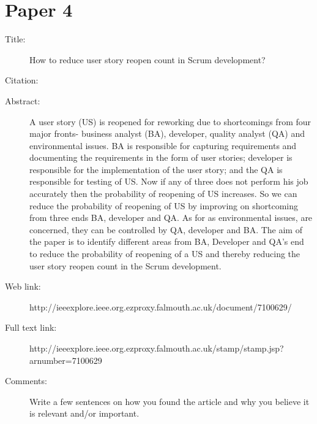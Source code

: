 \documentclass{scrartcl}
\begin{document}
\section*{Paper 4}
\begin{description}
\item[Title:] How to reduce user story reopen count in Scrum development?
\item[Citation:] \cite{chauhan2015reduce}
\item[Abstract:] A user story (US) is reopened for reworking due to shortcomings from four major fronts- business analyst (BA), developer, quality analyst (QA) and environmental issues. BA is responsible for capturing requirements and documenting the requirements in the form of user stories; developer is responsible for the implementation of the user story; and the QA is responsible for testing of US. Now if any of three does not perform his job accurately then the probability of reopening of US increases. So we can reduce the probability of reopening of US by improving on shortcoming from three ends BA, developer and QA. As for as environmental issues, are concerned, they can be controlled by QA, developer and BA. The aim of the paper is to identify different areas from BA, Developer and QA's end to reduce the probability of reopening of a US and thereby reducing the user story reopen count in the Scrum development.
\item[Web link:] http://ieeexplore.ieee.org.ezproxy.falmouth.ac.uk/document/7100629/
\item[Full text link:] http://ieeexplore.ieee.org.ezproxy.falmouth.ac.uk/stamp/stamp.jsp?arnumber=7100629
\item[Comments:] Write a few sentences on how you found the article and why you believe it is relevant and/or important.
\end{description}
\end{document}
